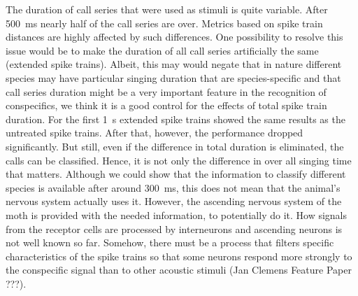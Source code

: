 \documentclass[12pt,a4paper]{article}
\begin{document}
The duration of call series that were used as stimuli is quite variable. After 500~ms nearly half of the call series are over. Metrics based on spike train distances are highly affected by such differences. One possibility to resolve this issue would be to make the duration of all call series artificially the same (extended spike trains). Albeit, this may would negate that in nature different species may have particular singing duration that are species-specific and that call series duration might be a very important feature in the recognition of conspecifics, we think it is a good control for the effects of total spike train duration. 
For the first 1~s extended spike trains showed the same results as the untreated spike trains. After that, however, the performance dropped significantly. But still, even if the difference in total duration is eliminated, the calls can be classified. Hence, it is not only the difference in over all singing time that matters. 
Although we could show that the information to classify different species is available after around 300~ms, this does not mean that the animal's nervous system actually uses it. However, the ascending nervous system of the moth is provided with the needed information, to potentially do it. How signals from the receptor cells are processed by interneurons and ascending neurons is not well known so far. Somehow, there must be a process that filters specific characteristics of the spike trains so that some neurons respond more strongly to the conspecific signal than to other acoustic stimuli (Jan Clemens Feature Paper ???).
\end{document}
